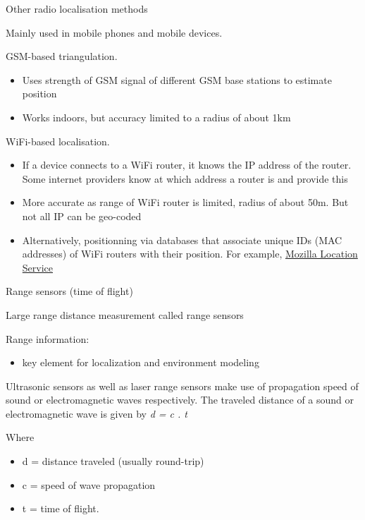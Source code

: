 \documentclass[compress]{beamer}
\begin{document}
\begin{frame}{Other radio localisation methods}

Mainly used in mobile phones and mobile devices.

GSM-based triangulation.

\begin{itemize}

\item
  Uses strength of GSM signal of different GSM base stations to estimate
  position
\item
  Works indoors, but accuracy limited to a radius of about 1km
\end{itemize}

\pause

WiFi-based localisation.

\begin{itemize}
\item
  If a device connects to a WiFi router, it knows the IP address of the
  router. Some internet providers know at which address a router is and
  provide this
\item More accurate as range of WiFi router is limited, radius of about 50m.
  But not all IP can be geo-coded
\item Alternatively, positionning via databases that associate unique IDs (MAC
    addresses) of WiFi routers with their position. For example,
        \href{https://location.services.mozilla.com/}{Mozilla Location Service}

\end{itemize}

\end{frame}

\begin{frame}{Range sensors (time of flight)}

Large range distance measurement \rightarrow called range sensors

Range information:

\begin{itemize}

\item
  key element for localization and environment modeling
\end{itemize}

Ultrasonic sensors as well as laser range sensors make use of
propagation speed of sound or electromagnetic waves respectively. The
traveled distance of a sound or electromagnetic wave is given by \emph{d
= c . t}

Where

\begin{itemize}

\item
  d = distance traveled (usually round-trip)
\item
  c = speed of wave propagation
\item
  t = time of flight.
\end{itemize}

\end{frame}
\end{document}
